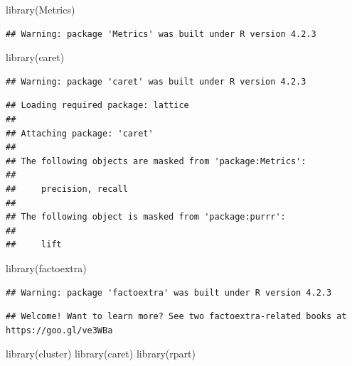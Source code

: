 \documentclass[
]{article}
\newenvironment{Shaded}{\begin{snugshade}}{\end{snugshade}}
\newcommand{\FunctionTok}[1]{\textcolor[rgb]{0.00,0.00,0.00}{#1}}
\newcommand{\NormalTok}[1]{#1}
\begin{document}
\begin{Shaded}
\begin{Highlighting}[]
\FunctionTok{library}\NormalTok{(Metrics)}
\end{Highlighting}
\end{Shaded}

\begin{verbatim}
## Warning: package 'Metrics' was built under R version 4.2.3
\end{verbatim}

\begin{Shaded}
\begin{Highlighting}[]
\FunctionTok{library}\NormalTok{(caret)}
\end{Highlighting}
\end{Shaded}

\begin{verbatim}
## Warning: package 'caret' was built under R version 4.2.3
\end{verbatim}

\begin{verbatim}
## Loading required package: lattice
## 
## Attaching package: 'caret'
## 
## The following objects are masked from 'package:Metrics':
## 
##     precision, recall
## 
## The following object is masked from 'package:purrr':
## 
##     lift
\end{verbatim}

\begin{Shaded}
\begin{Highlighting}[]
\FunctionTok{library}\NormalTok{(factoextra)}
\end{Highlighting}
\end{Shaded}

\begin{verbatim}
## Warning: package 'factoextra' was built under R version 4.2.3
\end{verbatim}

\begin{verbatim}
## Welcome! Want to learn more? See two factoextra-related books at https://goo.gl/ve3WBa
\end{verbatim}

\begin{Shaded}
\begin{Highlighting}[]
\FunctionTok{library}\NormalTok{(cluster)}
\FunctionTok{library}\NormalTok{(caret)}
\FunctionTok{library}\NormalTok{(rpart)}
\end{Highlighting}
\end{Shaded}
\end{document}
